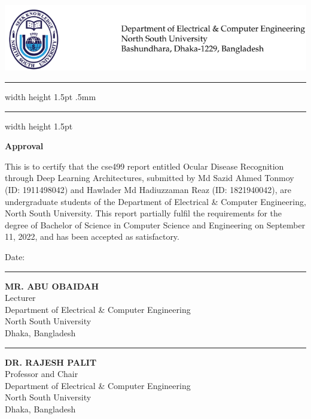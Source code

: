 
\chapter*{}
\vspace*{-5cm}


{\centering \includegraphics[width=\linewidth, scale=1]{02_Approval/letterhead.png}}
{\hrule width \hsize height 1.5pt \kern .5mm \hrule width \hsize height 1.5pt}

\vspace*{2ex}
\begin{center}
\textbf{\Large Approval}
\end{center}

\par This is to certify that the cse499 report entitled Ocular Disease Recognition through Deep Learning Architectures, submitted by Md Sazid Ahmed Tonmoy (ID: 1911498042) and Hawlader Md Hadiuzzaman Reaz (ID: 1821940042), are undergraduate students of the Department of Electrical & Computer Engineering, North South University. This report partially fulfil the requirements for the degree of Bachelor of Science in Computer Science and Engineering on September 11, 2022, and has been accepted as satisfactory.

\vspace{4em}
\begin{minipage}[t]{0.35\textwidth}
    Date: \\
\end{minipage}%
\hfill
\begin{minipage}[t]{0.55\textwidth}
    \raggedleft
    \hrule\vspace{2ex}
     \textbf{MR. ABU OBAIDAH} \\
    Lecturer \\
 	Department of Electrical & Computer Engineering \\
 	North South University \\
 	Dhaka, Bangladesh
	

     \vspace{5em}
     \hrule\vspace{2ex}
     \textbf{DR. RAJESH PALIT} \\
    Professor and Chair \\
 	Department of Electrical & Computer Engineering \\
 	North South University \\
 	Dhaka, Bangladesh
\end{minipage}


\let\cleardoublepage\clearpage
